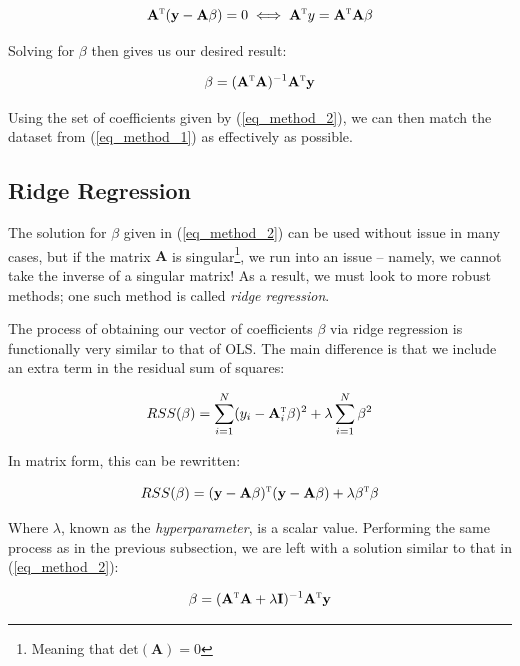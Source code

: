 \documentclass[a4paper,10pt,english]{article}
\begin{document}
\begin{equation*}
\mathbf{A}^\textsc{t} (\mathbf{y} - \mathbf{A} \beta) = 0 \iff \mathbf{A}^\textsc{t} y = \mathbf{A}^\textsc{t} \mathbf{A} \beta
\end{equation*}

Solving for $\beta$ then gives us our desired result:

\begin{equation}
\label{eq_method_2}
\beta = (\mathbf{A}^\textsc{t} \mathbf{A} ) ^{-1} \mathbf{A}^\textsc{t} \mathbf{y}
\end{equation}

Using the set of coefficients given by (\ref{eq_method_2}), we can then match the dataset from (\ref{eq_method_1}) as effectively as possible.

\subsection{Ridge Regression}

The solution for $\beta$ given in (\ref{eq_method_2}) can be used without issue in many cases, but if the matrix $\mathbf{A}$ is singular\footnote{Meaning that $\text{det}(\mathbf{A}) = 0$}, we run into an issue – namely, we cannot take the inverse of a singular matrix!  As a result, we must look to more robust methods; one such method is called \textit{ridge regression}.  

The process of obtaining our vector of coefficients $\beta$ via ridge regression is functionally very similar to that of OLS.  The main difference is that we include an extra term in the residual sum of squares:

\begin{equation*}
RSS(\beta) = \sum_{i=1}^N (y_i - \mathbf{A}_i^\textsc{t} \beta)^2 + \lambda \sum_{i=1}^N \beta^2
\end{equation*}

In matrix form, this can be rewritten:	

\begin{equation*}
RSS(\beta) = (\mathbf{y} - \mathbf{A} \beta)^\textsc{t}(\mathbf{y} - \mathbf{A} \beta) + \lambda \beta^\textsc{t} \beta
\end{equation*}

Where $\lambda$, known as the \textit{hyperparameter}, is a scalar value. Performing the same process as in the previous subsection, we are left with a solution similar to that in (\ref{eq_method_2}):

\begin{equation}
\label{eq_method_3}
\beta = (\mathbf{A}^\textsc{t} \mathbf{A} + \lambda \mathbf{I}) ^{-1} \mathbf{A}^\textsc{t} \mathbf{y}
\end{equation}
\end{document}
